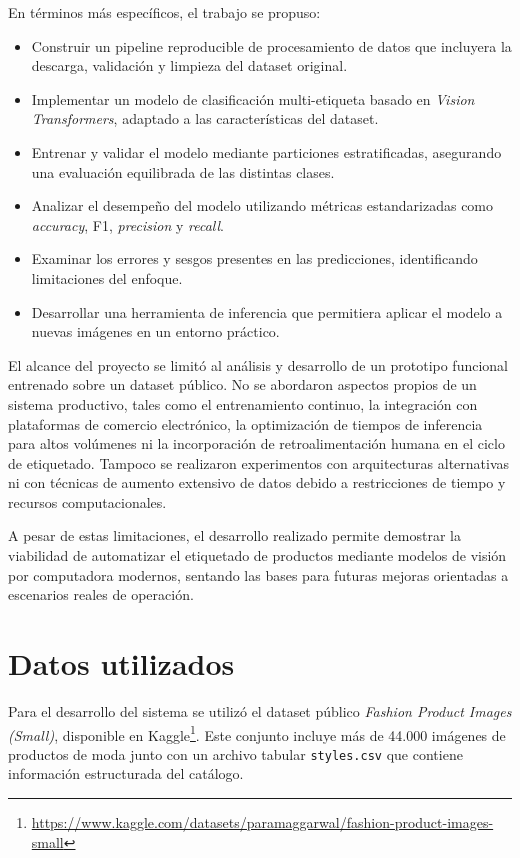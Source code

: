 En términos más específicos, el trabajo se propuso:

\begin{itemize}
    \item Construir un pipeline reproducible de procesamiento de datos que incluyera la descarga, validación y limpieza del dataset original.
    \item Implementar un modelo de clasificación multi-etiqueta basado en \textit{Vision Transformers}, adaptado a las características del dataset.
    \item Entrenar y validar el modelo mediante particiones estratificadas, asegurando una evaluación equilibrada de las distintas clases.
    \item Analizar el desempeño del modelo utilizando métricas estandarizadas como \textit{accuracy}, F1, \textit{precision} y \textit{recall}.
    \item Examinar los errores y sesgos presentes en las predicciones, identificando limitaciones del enfoque.
    \item Desarrollar una herramienta de inferencia que permitiera aplicar el modelo a nuevas imágenes en un entorno práctico.
\end{itemize}

El alcance del proyecto se limitó al análisis y desarrollo de un prototipo funcional entrenado sobre un dataset público. No se abordaron aspectos propios de un sistema productivo, tales como el entrenamiento continuo, la integración con plataformas de comercio electrónico, la optimización de tiempos de inferencia para altos volúmenes ni la incorporación de retroalimentación humana en el ciclo de etiquetado. Tampoco se realizaron experimentos con arquitecturas alternativas ni con técnicas de aumento extensivo de datos debido a restricciones de tiempo y recursos computacionales.

A pesar de estas limitaciones, el desarrollo realizado permite demostrar la viabilidad de automatizar el etiquetado de productos mediante modelos de visión por computadora modernos, sentando las bases para futuras mejoras orientadas a escenarios reales de operación.

\section{Datos utilizados}

Para el desarrollo del sistema se utilizó el dataset público \textit{Fashion Product Images (Small)}, disponible en Kaggle\footnote{\url{https://www.kaggle.com/datasets/paramaggarwal/fashion-product-images-small}}. Este conjunto incluye más de 44.000 imágenes de productos de moda junto con un archivo tabular \texttt{styles.csv} que contiene información estructurada del catálogo.

